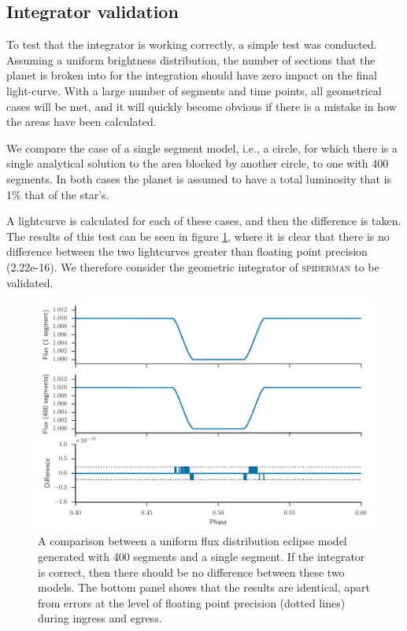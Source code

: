 \documentclass[a4paper,fleqn,usenatbib]{mnras}
\begin{document}
\subsection{Integrator validation}\label{sec:numerical}

To test that the integrator is working correctly, a simple test was conducted. Assuming a uniform brightness distribution, the number of sections that the planet is broken into for the integration should have zero impact on the final light-curve. With a large number of segments and time points, all geometrical cases will be met, and it will quickly become obvious if there is a mistake in how the areas have been calculated.

We compare the case of a single segment model, i.e., a circle, for which there is a single analytical solution to the area blocked by another circle, to one with 400 segments. In both cases the planet is assumed to have a total luminosity that is 1\% that of the star's.

A lightcurve is calculated for each of these cases, and then the difference is taken. The results of this test can be seen in figure \ref{fig:precision}, where it is clear that there is no difference between the two lightcurves greater than floating point precision (2.22e-16). We therefore consider the geometric integrator of \textsc{spiderman} to be validated.

\begin{figure}
\begin{center}
\includegraphics[width=\columnwidth]{img/precision.pdf}
\caption{A comparison between a uniform flux distribution eclipse model generated with 400 segments and a single segment. If the integrator is correct, then there should be no difference between these two models. The bottom panel shows that the results are identical, apart from errors at the level of floating point precision (dotted lines) during ingress and egress.}
\label{fig:precision}
\end{center}
\end{figure}
\end{document}
